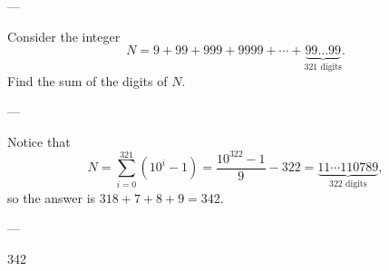 
---

Consider the integer \[N=9+99+999+9999+\cdots+\underbrace{99\ldots 99}_\text{321 digits}.\]
Find the sum of the digits of $N$.

---

Notice that \[N=\sum_{i=0}^{321}(10^i-1)=\frac{10^{322}-1}9-322=\underbrace{11\cdots 110789}_\text{322 digits},\]
so the answer is $318+7+8+9=342$.

---

342
